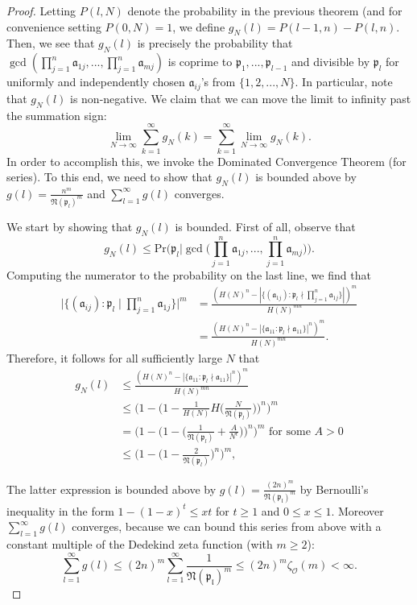 \documentclass[12pt]{amsart}
\theoremstyle{definition}
\newcommand{\f}[1]{\mathfrak{#1}}
\begin{document}
\begin{proof}
	Letting $P(l, N)$ denote the probability in the previous theorem (and for convenience setting $P(0, N) = 1$, we define $g_N(l) = P(l-1, n) - P(l, n)$. Then, we see that $g_N(l)$ is precisely the probability that $\gcd(\prod_{j=1}^n \mathfrak{a}_{1j}, ... , \prod_{j=1}^n \mathfrak{a}_{mj})$ is coprime to $\mathfrak{p}_1, ..., \mathfrak{p}_{l-1}$ and divisible by $\mathfrak{p}_l$ for uniformly and independently chosen $\mathfrak{a}_{ij}$'s from $\{1, 2, ..., N\}$. In particular, note that $g_N(l)$ is non-negative. We claim that we can move the limit to infinity past the summation sign:
	$$\lim_{N \to \infty} \sum_{k=1}^{\infty} g_N(k) = \sum_{k=1}^{\infty} \lim_{N \to \infty} g_N(k).$$
	In order to accomplish this, we invoke the Dominated Convergence Theorem (for series). To this end, we need to show that $g_N(l)$ is bounded above by $g(l) = \frac{n^m}{\mathfrak{N}(\mathfrak{p}_l)^m}$ and $\sum_{l=1}^{\infty} g(l)$ converges.
	
	We start by showing that $g_N(l)$ is bounded. First of all, observe that
	$$g_N(l) \leq \text{Pr}\Big(\mathfrak{p}_l \Big| \gcd\Big(\prod_{j=1}^n \mathfrak{a}_{1j}, ... , \prod_{j=1}^n \mathfrak{a}_{mj}\Big)\Big).$$
	Computing the numerator to the probability on the last line, we find that
	\begin{align*} 
		\Big|\{(\f{a}_{ij}) : \mathfrak{p}_l \mid \prod_{j=1}^n \mathfrak{a}_{1j}\}\Big|^m &= \frac{(H(N)^n - |\{(\mathfrak{a}_{1j}) : \mathfrak{p}_l \nmid \prod_{j=1}^n \mathfrak{a}_{1j}\}|)^m}{H(N)^{mn}}\\ &= \frac{(H(N)^n - |\{\f{a}_{11} : \mathfrak{p}_l \nmid \mathfrak{a}_{11}\}|^n)^m}{H(N)^{mn}}. \end{align*}
	Therefore, it follows for all sufficiently large $N$ that
	\begin{align*} 
		g_N(l) &\leq \frac{(H(N)^n - |\{\f{a}_{11} : \mathfrak{p}_l \nmid \mathfrak{a}_{11}\}|^n)^m}{H(N)^{mn}}\\ &\leq \Big(1 - \Big(1 - \frac{1}{H(N)} H\Big(\frac{N}{\f{N}(\f{p}_l)}\Big)\Big)^n\Big)^m\\
		&= \Big(1- \Big(1 - \Big(\frac{1}{\mathfrak{N}(\mathfrak{p}_l)} + \frac{A}{N^{\epsilon}}\Big)\Big)^n \Big)^m \text{ for some } A > 0\\ &\leq \Big(1- \Big(1 - \frac{2}{\mathfrak{N}(\mathfrak{p}_l)}\Big)^n \Big)^m, \end{align*}
	
	The latter expression is bounded above by $g(l) = \frac{(2n)^m}{\f{N(\f{p}_l)}^m}$ by Bernoulli's inequality in the form $1-(1-x)^t\leq xt$ for $t\geq 1$ and $0\leq x \leq 1$. Moreover $\sum_{l=1}^{\infty} g(l)$ converges, because we can bound this series from above with a constant multiple of the Dedekind zeta function (with $m \geq 2$):
	$$\sum_{l=1}^{\infty}g(l)\leq (2n)^m\sum_{l=1}^{\infty}\frac{1}{\f{N(\f{p}_l)}^m}\leq (2n)^m \zeta_{\mathcal{O}}(m) < \infty.$$
	

\end{proof}
\end{document}
